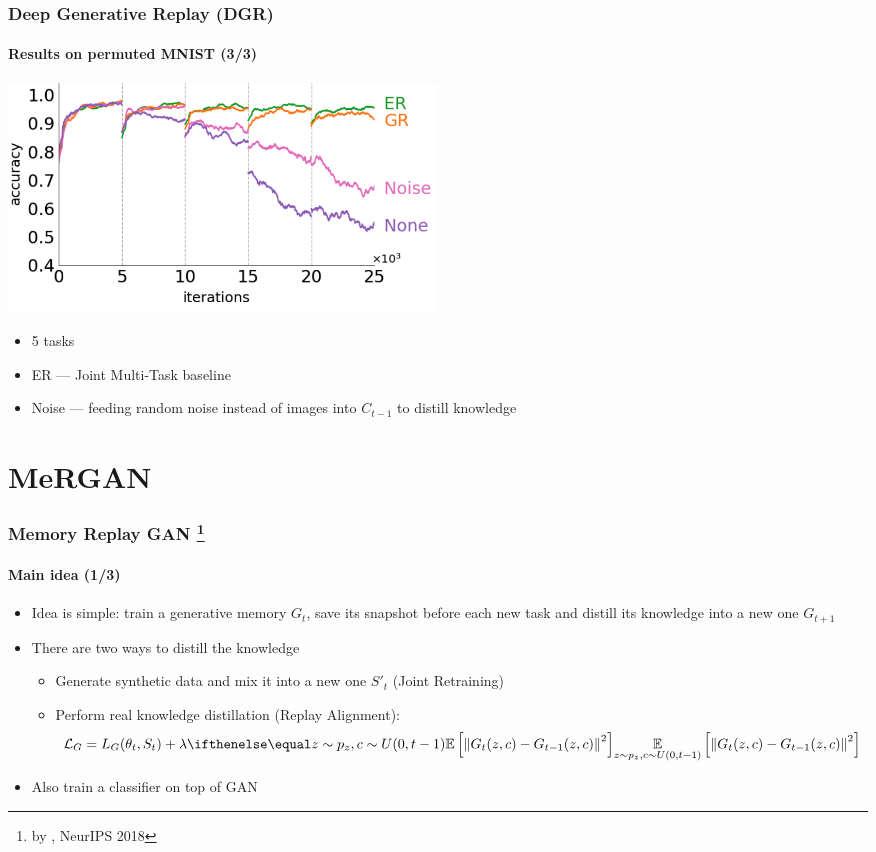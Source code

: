 \documentclass[10pt]{beamer}
\newcommand{\citepaper}[1]{\citetitle{#1} by \citeauthor{#1}}
\begin{document}
\begin{frame}
    \frametitle{Deep Generative Replay (DGR)}
    \framesubtitle{Results on permuted MNIST (3/3)}
    
    \centering
    \includegraphics[width=0.5\textwidth]{images/dgr-results}
    
    \begin{itemize}
        \item 5 tasks
        \item ER --- Joint Multi-Task baseline
        \item Noise --- feeding random noise instead of images into $C_{t-1}$ to distill knowledge
    \end{itemize}
\end{frame}

\section{MeRGAN}
\begin{frame}
    \frametitle{Memory Replay GAN \footnote{\citepaper{MeRGAN}, NeurIPS 2018}}
    \framesubtitle{Main idea (1/3)}
    
    \begin{itemize}
        \item Idea is simple: train a generative memory $G_t$, save its snapshot before each new task and distill its knowledge into a new one $G_{t+1}$
        \item There are two ways to distill the knowledge
        \begin{itemize}
            \item Generate synthetic data and mix it into a new one $S'_t$ (Joint Retraining)
            \item Perform real knowledge distillation (Replay Alignment):
            \[
            \mathcal{L}_G = L_G(\theta_t, S_t) + \lambda \expect[z \sim p_z, c \sim U(0, t-1)]{\left\| G_t(z, c) - G_{t-1}(z, c) \right\|^2}
            \]
        \end{itemize}
        \item Also train a classifier on top of GAN
    \end{itemize}
\end{frame}
\end{document}
